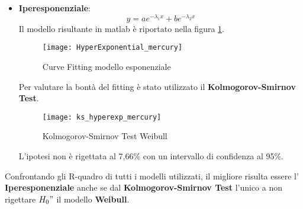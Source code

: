 \begin{itemize}
  \clearpage

  \item \textbf{Iperesponenziale}:
  $$ y = a e^{- \lambda_1  x} +  b  e^{- \lambda_2  x} $$
  Il modello risultante in matlab è riportato nella figura \ref{HyperExponential_mercury}.\\

  \begin{figure}[!htbp]
    \texttt{[image: HyperExponential\_mercury]}
    \caption{Curve Fitting modello esponenziale}
    \label{HyperExponential_mercury}
  \end{figure}

  Per valutare la bontà del fitting è stato utilizzato il \textbf{Kolmogorov-Smirnov Test}.\\

  \begin{figure}[!htbp]
    \centering
    \texttt{[image: ks\_hyperexp\_mercury]}
    \caption{Kolmogorov-Smirnov Test Weibull}
    \label{ks_hyperexp_mercury}
  \end{figure}

  L'ipotesi non è rigettata al 7,66\% con un intervallo di confidenza al 95\%.\\

  \clearpage
\end{itemize}

Confrontando gli R-quadro di tutti i modelli utilizzati, il migliore risulta essere l'
\textbf{Iperesponenziale} anche se dal \textbf{Kolmogorov-Smirnov Test} l'unico
a non rigettare $H_0"$ il modello \textbf{Weibull}.\\
